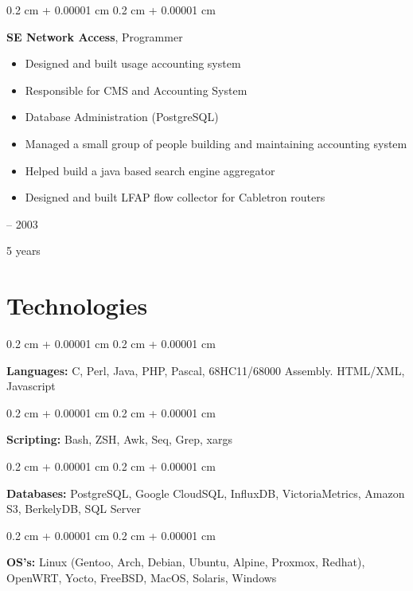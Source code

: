 \documentclass[12pt, a4paper]{article}
\newenvironment{highlights}{
    \begin{itemize}[
        topsep=0.10 cm,
        parsep=0.10 cm,
        partopsep=0pt,
        itemsep=0pt,
        leftmargin=0.4 cm + 10pt
    ]
}{
    \end{itemize}
} %
\newenvironment{onecolentry}{
    \begin{adjustwidth}{
        0.2 cm + 0.00001 cm
    }{
        0.2 cm + 0.00001 cm
    }
}{
    \end{adjustwidth}
} %
\newenvironment{twocolentry}[2][]{
    \onecolentry
    \def\secondColumn{#2}
    \setcolumnwidth{\fill, 4.5 cm}
    \begin{paracol}{2}
}{
    \switchcolumn \raggedleft \secondColumn
    \end{paracol}
    \endonecolentry
} %
\begin{document}
        \begin{twocolentry}{
            1998 – 2003

        5 years
        }
            \textbf{SE Network Access}, Programmer
            \begin{highlights}
                \item Designed and built usage accounting system
                \item Responsible for CMS and Accounting System
                \item Database Administration (PostgreSQL)
                \item Managed a small group of people building and maintaining accounting system
                \item Helped build a java based search engine aggregator
                \item Designed and built LFAP flow collector for Cabletron routers
            \end{highlights}
        \end{twocolentry}



    
    \section{Technologies}



        
        \begin{onecolentry}
            \textbf{Languages:} C, Perl, Java, PHP, Pascal, 68HC11/68000 Assembly. HTML/XML, Javascript
        \end{onecolentry}

        \vspace{0.2 cm}

        \begin{onecolentry}
            \textbf{Scripting:} Bash, ZSH, Awk, Seq, Grep, xargs
        \end{onecolentry}

        \vspace{0.2 cm}

        \begin{onecolentry}
            \textbf{Databases:} PostgreSQL, Google CloudSQL, InfluxDB, VictoriaMetrics, Amazon S3, BerkelyDB, SQL Server
        \end{onecolentry}

        \vspace{0.2 cm}

        \begin{onecolentry}
            \textbf{OS's:} Linux (Gentoo, Arch, Debian, Ubuntu, Alpine, Proxmox, Redhat), OpenWRT, Yocto, FreeBSD, MacOS, Solaris, Windows
        \end{onecolentry}
\end{document}
